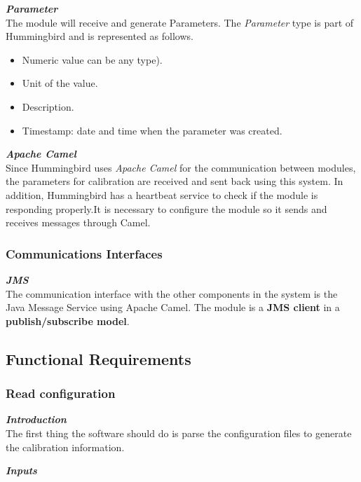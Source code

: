 \textbf{\emph{Parameter}}\\
The module will receive and generate Parameters. The \emph{Parameter} type is part of Hummingbird and is represented as follows.

\begin{itemize}
\item Numeric value can be any type).
\item Unit of the value.
\item Description.
\item Timestamp: date and time when the parameter was created.

\end{itemize}


\textbf{\emph{Apache Camel}}\citep{Camel}\\
Since Hummingbird uses \emph{Apache Camel} for the communication between modules, the parameters for calibration are received and sent back using this system. In addition, Hummingbird has a heartbeat service to check if the module is responding properly.It is necessary to configure the module so it sends and receives messages through Camel.


\subsubsection{Communications Interfaces}

\textbf{\emph{JMS}}\cite{JMS}\\
The communication interface with the other components in the system is the Java Message Service using Apache Camel. The module is a \textbf{JMS client} in a \textbf{publish/subscribe model}.

\pagebreak

\subsection{Functional Requirements}

\subsubsection{Read configuration}

\textbf{\emph{Introduction}}\\
The first thing the software should do is parse the configuration files to generate the calibration information.

\textbf{\emph{Inputs}}\\


